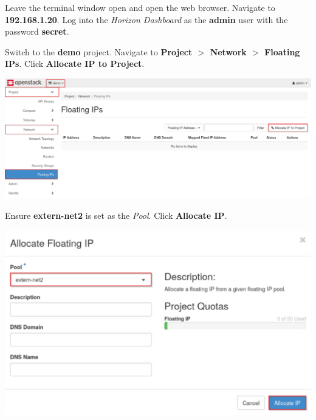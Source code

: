 \documentclass[letterpaper, 12pt]{article}
\begin{document}
\begin{enumerate}
    \begin{labstep}
        Leave the terminal window open and open the web browser.
        Navigate to \textbf{192.168.1.20}.
        Log into the \textit{Horizon Dashboard} as the \textbf{admin} user with the password \textbf{secret}.
    \end{labstep}

    \begin{labstep}
        Switch to the \textbf{demo} project.
        Navigate to \textbf{Project $>$ Network $>$ Floating IPs}.
        Click \textbf{Allocate IP to Project}.

        \begin{center}
            \includegraphics[width=\linewidth]{images/part3/step4.png}
        \end{center}
    \end{labstep}

    \begin{labstep}

        Ensure \textbf{extern-net2} is set as the \textit{Pool}.
        Click \textbf{Allocate IP}.

        \begin{center}
            \includegraphics[width=\linewidth]{images/part3/step5.png}
        \end{center}
    \end{labstep}


\end{enumerate}
\end{document}
